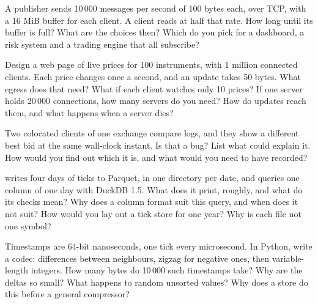 \begin{question}\label{iq:iv3:system-design:15}
A publisher sends 10\,000 messages per second of 100 bytes each, over TCP, with a 16 MiB buffer for each client. A client reads at half that rate. How long until its buffer is full? What are the choices then? Which do you pick for a dashboard, a risk system and a trading engine that all subscribe?
\end{question}

\begin{question}\label{iq:iv3:system-design:16}
Design a web page of live prices for 100 instruments, with 1 million connected clients. Each price changes once a second, and an update takes 50 bytes. What egress does that need? What if each client watches only 10 prices? If one server holds 20\,000 connections, how many servers do you need? How do updates reach them, and what happens when a server dies?
\end{question}

\begin{question}\label{iq:iv3:system-design:17}
Two colocated clients of one exchange compare logs, and they show a different best bid at the same wall-clock instant. Is that a bug? List what could explain it. How would you find out which it is, and what would you need to have recorded?
\end{question}

\begin{question}\label{iq:iv3:system-design:18}
 writes four days of ticks to Parquet, in one directory per date, and queries one column of one day with DuckDB 1.5. What does it print, roughly, and what do its checks mean? Why does a column format suit this query, and when does it not suit? How would you lay out a tick store for one year? Why is each file not one symbol?
\label{lst:iv3:sd:columns}
\end{question}

\begin{question}\label{iq:iv3:system-design:19}
Timestamps are 64-bit nanoseconds, one tick every microsecond. In Python, write a codec: differences between neighbours, zigzag for negative ones, then variable-length integers. How many bytes do 10\,000 such timestamps take? Why are the deltas so small? What happens to random unsorted values? Why does a store do this before a general compressor?
\end{question}

